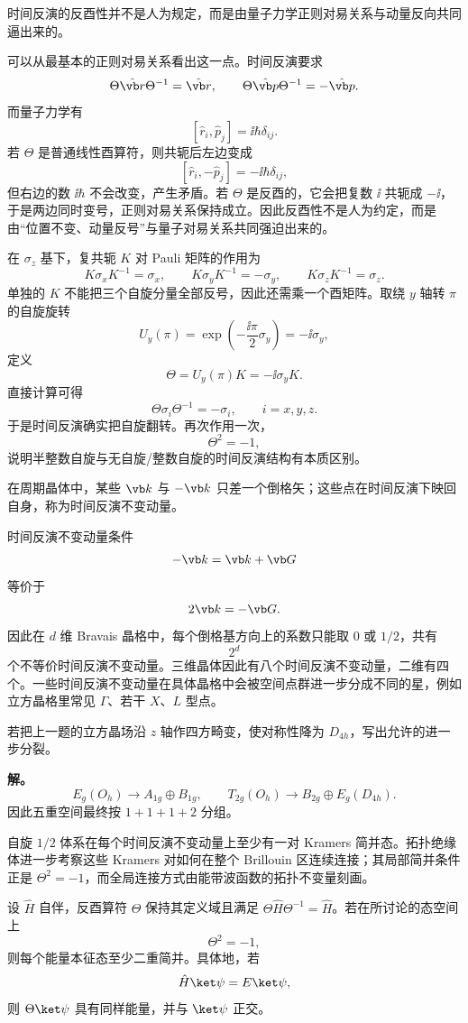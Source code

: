 时间反演的反酉性并不是人为规定，而是由量子力学正则对易关系与动量反向共同逼出来的。

可以从最基本的正则对易关系看出这一点。时间反演要求
\[
\Theta\hat{\vb r}\Theta^{-1}=\hat{\vb r},
\qquad
\Theta\hat{\vb p}\Theta^{-1}=-\hat{\vb p}.
\]
而量子力学有
\[
[\hat r_i,\hat p_j]=\ii\hbar\delta_{ij}.
\]
若 $\Theta$ 是普通线性酉算符，则共轭后左边变成
\[
[\hat r_i,-\hat p_j]=-\ii\hbar\delta_{ij},
\]
但右边的数 $\ii\hbar$ 不会改变，产生矛盾。若 $\Theta$ 是反酉的，它会把复数 $\ii$ 共轭成 $-\ii$，于是两边同时变号，正则对易关系保持成立。因此反酉性不是人为约定，而是由“位置不变、动量反号”与量子对易关系共同强迫出来的。


在 $\sigma_z$ 基下，复共轭 $K$ 对 Pauli 矩阵的作用为
\[
K\sigma_xK^{-1}=\sigma_x,
\qquad
K\sigma_yK^{-1}=-\sigma_y,
\qquad
K\sigma_zK^{-1}=\sigma_z.
\]
单独的 $K$ 不能把三个自旋分量全部反号，因此还需乘一个酉矩阵。取绕 $y$ 轴转 $\pi$ 的自旋旋转
\[
U_y(\pi)=\exp\!\left(-\frac{\ii\pi}{2}\sigma_y\right)=-\ii\sigma_y,
\]
定义
\[
\Theta=U_y(\pi)K=-\ii\sigma_yK.
\]
直接计算可得
\[
\Theta\sigma_i\Theta^{-1}=-\sigma_i,
\qquad i=x,y,z.
\]
于是时间反演确实把自旋翻转。再次作用一次，
\[
\Theta^2=-1,
\]
说明半整数自旋与无自旋/整数自旋的时间反演结构有本质区别。

在周期晶体中，某些 $\vb k$ 与 $-\vb k$ 只差一个倒格矢；这些点在时间反演下映回自身，称为时间反演不变动量。

时间反演不变动量条件
\[
-\vb k=\vb k+\vb G
\]
等价于
\[
2\vb k=-\vb G.
\]
因此在 $d$ 维 Bravais 晶格中，每个倒格基方向上的系数只能取 $0$ 或 $1/2$，共有
\[
2^d
\]
个不等价时间反演不变动量。三维晶体因此有八个时间反演不变动量，二维有四个。一些时间反演不变动量在具体晶格中会被空间点群进一步分成不同的星，例如立方晶格里常见 $\Gamma$、若干 $X$、$L$ 型点。

\begin{workedexample}
若把上一题的立方晶场沿 $z$ 轴作四方畸变，使对称性降为 $D_{4h}$，写出允许的进一步分裂。

\textbf{解。}
\[
E_g(O_h)\to A_{1g}\oplus B_{1g},
\qquad
T_{2g}(O_h)\to B_{2g}\oplus E_g(D_{4h}).
\]
因此五重空间最终按 $1+1+1+2$ 分组。
\end{workedexample}


自旋 $1/2$ 体系在每个时间反演不变动量上至少有一对 Kramers 简并态。拓扑绝缘体进一步考察这些 Kramers 对如何在整个 Brillouin 区连续连接；其局部简并条件正是 $\Theta^2=-1$，而全局连接方式由能带波函数的拓扑不变量刻画。

\begin{theorem}[Kramers 定理]
设 $\hat H$ 自伴，反酉算符 $\Theta$ 保持其定义域且满足 $\Theta\hat H\Theta^{-1}=\hat H$。若在所讨论的态空间上
\[
\Theta^2=-1,
\]
则每个能量本征态至少二重简并。具体地，若
\[
\hat H\ket\psi=E\ket\psi,
\]
则 $\Theta\ket\psi$ 具有同样能量，并与 $\ket\psi$ 正交。
\label{thm:kramers}




\end{theorem}

